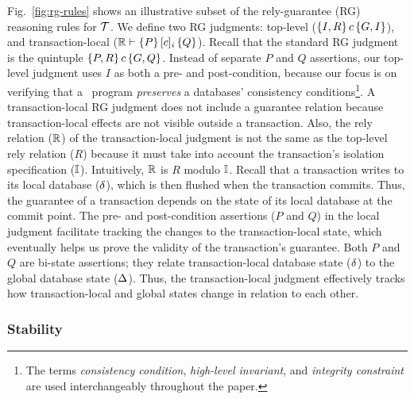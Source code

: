 Fig.~\ref{fig:rg-rules} shows an illustrative subset of the
rely-guarantee (RG) reasoning rules for $\mbox{${\mathcal T}$}$. We define two RG
judgments: top-level ($\{I,R\}\,c\,\{G,I\}$), and transaction-local ($\mathbb{R}
\vdash \{P\}\,\lbrack c \rbrack_i\,\{Q\}$).  Recall that the standard RG judgment is the
quintuple $\{P,R\}\,c\,\{G,Q\}$. Instead of separate $P$ and $Q$
assertions, our top-level judgment uses $I$ as both a pre- and
post-condition, because our focus is on verifying that a
\txnimp\ program \emph{preserves} a databases' consistency
conditions\footnote{The terms \emph{consistency condition},
  \emph{high-level invariant}, and \emph{integrity constraint} are
  used interchangeably throughout the paper.}.  A transaction-local RG
judgment does not include a guarantee relation because
transaction-local effects are not visible outside a transaction. Also,
the rely relation ($\mathbb{R}$) of the transaction-local judgment is not the
same as the top-level rely relation ($R$) because it must take into
account the transaction's isolation specification ($\mathbb{I}$). Intuitively,
$\mathbb{R}$ is $R$ modulo $\mathbb{I}$.  Recall that a transaction writes to its
local database ($\delta$), which is then flushed when the transaction
commits. Thus, the guarantee of a transaction depends on the state of
its local database at the commit point. The pre- and post-condition
assertions ($P$ and $Q$) in the local judgment facilitate tracking the
changes to the transaction-local state, which eventually helps us
prove the validity of the transaction's guarantee.  Both $P$ and $Q$
are bi-state assertions; they relate transaction-local database state
($\delta$) to the global database state ($\Delta$). Thus, the
transaction-local judgment effectively tracks how transaction-local
and global states change in relation to each other.

\subsubsection{Stability}

